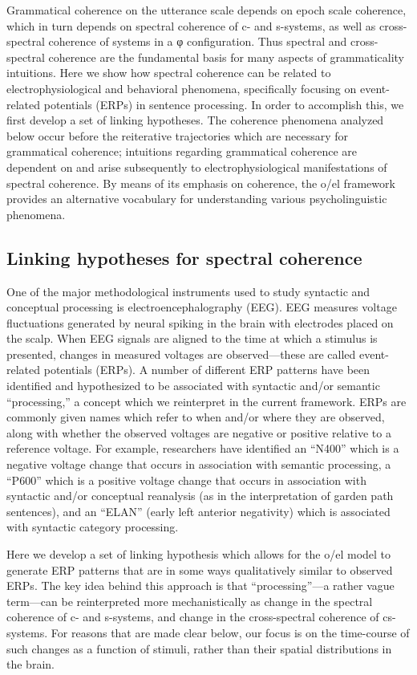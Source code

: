 Grammatical coherence on the utterance scale depends on epoch scale coherence, which in turn depends on spectral coherence of c- and s-systems, as well as cross-spectral coherence of systems in a φ configuration. Thus spectral and cross-spectral coherence are the fundamental basis for many aspects of grammaticality intuitions. Here we show how spectral coherence can be related to electrophysiological and behavioral phenomena, specifically focusing on event-related potentials (ERPs) in sentence processing. In order to accomplish this, we first develop a set of linking hypotheses. The coherence phenomena analyzed below occur before the reiterative trajectories which are necessary for grammatical coherence; intuitions regarding grammatical coherence are dependent on and arise subsequently to electrophysiological manifestations of spectral coherence. By means of its emphasis on coherence, the o/el framework provides an alternative vocabulary for understanding various psycholinguistic phenomena.

\subsection{Linking hypotheses for spectral coherence}

One of the major methodological instruments used to study syntactic and conceptual processing is electroencephalography (EEG). EEG measures voltage fluctuations generated by neural spiking in the brain with electrodes placed on the scalp. When EEG signals are aligned to the time at which a stimulus is presented, changes in measured voltages are observed—these are called event-related potentials (ERPs). A number of different ERP patterns have been identified and hypothesized to be associated with syntactic and/or semantic “processing,” a concept which we reinterpret in the current framework. ERPs are commonly given names which refer to when and/or where they are observed, along with whether the observed voltages are negative or positive relative to a reference voltage. For example, researchers have identified an “N400” which is a negative voltage change that occurs in association with semantic processing, a “P600” which is a positive voltage change that occurs in association with syntactic and/or conceptual reanalysis (as in the interpretation of garden path sentences), and an “ELAN” (early left anterior negativity) which is associated with syntactic category processing. 

Here we develop a set of linking hypothesis which allows for the o/el model to generate ERP patterns that are in some ways qualitatively similar to observed ERPs. The key idea behind this approach is that “processing”—a rather vague term—can be reinterpreted more mechanistically as change in the spectral coherence of c- and s-systems, and change in the cross-spectral coherence of cs-systems. For reasons that are made clear below, our focus is on the time-course of such changes as a function of stimuli, rather than their spatial distributions in the brain.


